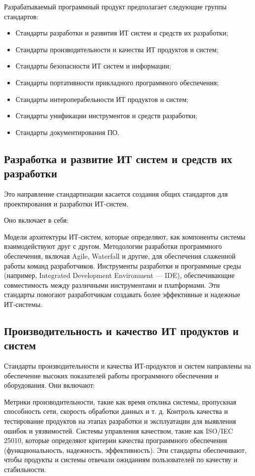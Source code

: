 Разрабатываемый программный продукт предполагает следующие группы стандартов:

\begin{itemize}
	\item Стандарты разработки и развития ИТ систем и средств их разработки;
\item Стандарты производительности и качества ИТ продуктов и систем;
\item Стандарты безопасности ИТ систем и информации;
	\item Стандарты портативности прикладного программного обеспечения;
		\item Стандарты интероперабельности ИТ продуктов и систем;
		\item Стандарты унификации инструментов и средств разработки;
	\item Стандарты документирования ПО.
\end{itemize}

\subsection{Разработка и развитие ИТ систем и средств их разработки}
Это направление стандартизации касается создания общих стандартов
для проектирования и разработки ИТ-систем.

Оно включает в себя:

Модели архитектуры ИТ-систем, которые определяют, как компоненты системы взаимодействуют друг с другом.
Методологии разработки программного обеспечения, включая Agile, Waterfall и другие, для обеспечения слаженной работы команд разработчиков.
Инструменты разработки и программные среды (например, Integrated Development Environment — IDE), обеспечивающие совместимость между различными инструментами и платформами.
Эти стандарты помогают разработчикам создавать более эффективные и надежные ИТ-системы.

\subsection{Производительность и качество ИТ продуктов и систем}
Стандарты производительности и качества ИТ-продуктов и систем направлены на обеспечение высоких показателей работы программного обеспечения и оборудования. Они включают:

Метрики производительности, такие как время отклика системы, пропускная способность сети, скорость обработки данных и т. д.
Контроль качества и тестирование продуктов на этапах разработки и эксплуатации для выявления ошибок и уязвимостей.
Системы управления качеством, такие как ISO/IEC 25010, которые определяют критерии качества программного обеспечения (функциональность, надежность, эффективность).
Эти стандарты обеспечивают, чтобы продукты и системы отвечали ожиданиям пользователей по качеству и стабильности.


